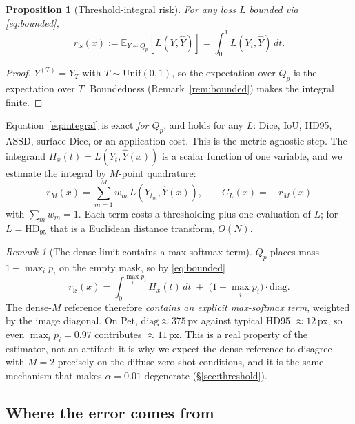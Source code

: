 \documentclass[11pt]{article}
\newtheorem{proposition}{Proposition}
\theoremstyle{remark}
\newtheorem{remark}{Remark}
\newcommand{\Yhat}{\widehat{Y}}
\newcommand{\HDF}{\mathrm{HD}_{95}}
\newcommand{\Ex}{\mathbb{E}}
\newcommand{\diag}{\mathrm{diag}}
\begin{document}
\begin{proposition}[Threshold-integral risk]\label{prop:integral}
For any loss $L$ bounded via \eqref{eq:bounded},
\begin{equation}\label{eq:integral}
r_{\mathrm{ls}}(x) := \Ex_{Y\sim Q_p}[L(Y,\Yhat)] = \int_0^1 L(Y_t,\Yhat)\,dt .
\end{equation}
\end{proposition}
\begin{proof}
$Y^{(T)}=Y_T$ with $T\sim\mathrm{Unif}(0,1)$, so the expectation over $Q_p$ is the
expectation over $T$. Boundedness (Remark~\ref{rem:bounded}) makes the integral
finite.
\end{proof}

Equation~\eqref{eq:integral} is exact \emph{for $Q_p$}, and holds for any $L$:
Dice, IoU, HD95, ASSD, surface Dice, or an application cost. This is the
metric-agnostic step. The integrand $H_x(t) = L(Y_t,\Yhat(x))$ is a scalar function
of one variable, and we estimate the integral by $M$-point quadrature:
\begin{equation}\label{eq:quad}
\boxed{\;
r_M(x) = \sum_{m=1}^{M} w_m\, L(Y_{t_m},\Yhat(x)),
\qquad
C_L(x) = -\, r_M(x)
\;}
\end{equation}
with $\sum_m w_m = 1$. Each term costs a thresholding plus one evaluation of $L$;
for $L=\HDF$ that is a Euclidean distance transform, $O(N)$.

\begin{remark}[The dense limit contains a max-softmax term]\label{rem:atom}
$Q_p$ places mass $1-\max_i p_i$ on the empty mask, so by \eqref{eq:bounded}
\begin{equation}
r_{\mathrm{ls}}(x) = \int_0^{\max_i p_i} H_x(t)\,dt \;+\; \big(1-\max_i p_i\big)\cdot\diag .
\end{equation}
The dense-$M$ reference therefore \emph{contains an explicit max-softmax term},
weighted by the image diagonal. On Pet, $\diag\approx 375$\,px against typical HD95
$\approx 12$\,px, so even $\max_i p_i = 0.97$ contributes $\approx 11$\,px. This is
a real property of the estimator, not an artifact: it is why we expect the dense
reference to disagree with $M=2$ precisely on the diffuse zero-shot conditions, and
it is the same mechanism that makes $\alpha=0.01$ degenerate
(\S\ref{sec:threshold}).
\end{remark}

\subsection{Where the error comes from}\label{sec:error}
\end{document}
